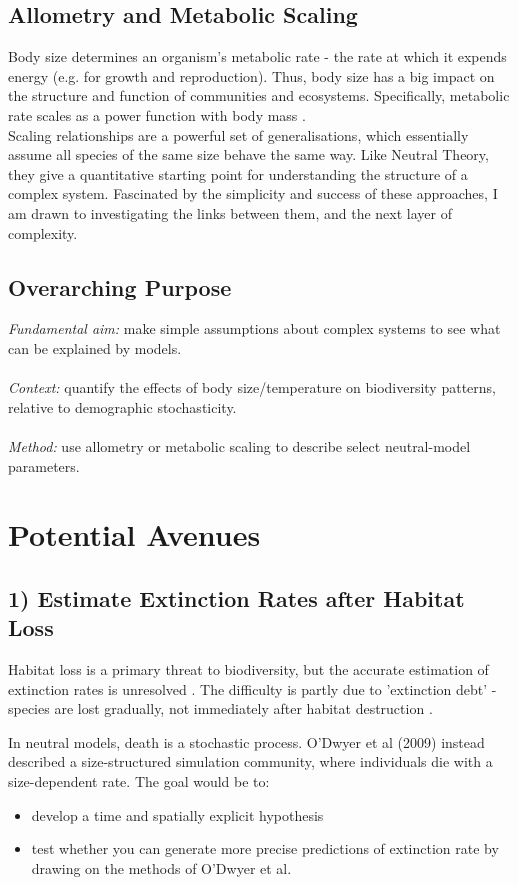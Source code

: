 \documentclass[11pt]{article}
\begin{document}
\subsection*{Allometry and Metabolic Scaling}
Body size determines an organism's metabolic rate - the rate at which it expends energy (e.g. for growth and reproduction). Thus, body size has a big impact on the structure and function of communities and ecosystems. Specifically, metabolic rate scales as a power function with body mass \cite{sibly2012metabolic}.\\

Scaling relationships are a powerful set of generalisations, which essentially assume all species of the same size behave the same way. Like Neutral Theory, they give a quantitative starting point for understanding the structure of a complex system. Fascinated by the simplicity and success of these approaches, I am drawn to investigating the links between them, and the next layer of complexity.

\subsection*{Overarching Purpose}
\emph{Fundamental aim:} make simple assumptions about complex systems to see what can be explained by models.\\
\\
\emph{Context:} quantify the effects of body size/temperature on biodiversity patterns, relative to demographic stochasticity.\\
\\
\emph{Method:} use allometry or metabolic scaling to describe select neutral-model parameters.

\section*{Potential Avenues}
\subsection*{1) Estimate Extinction Rates after Habitat Loss}
Habitat loss is a primary threat to biodiversity, but the accurate estimation of extinction rates is unresolved \cite{halley2011neutral}. The difficulty is partly due to 'extinction debt' - species are lost gradually, not immediately after habitat destruction \cite{he2011species}.

In neutral models, death is a stochastic process. O'Dwyer et al (2009) instead described a size-structured simulation community, where individuals die with a size-dependent rate. The goal would be to:
\begin{itemize}
	\item develop a time and spatially explicit hypothesis
	\item test whether you can generate more precise predictions of extinction rate by drawing on the methods of O'Dwyer et al.
\end{itemize}
\end{document}
